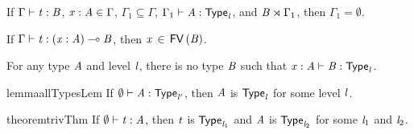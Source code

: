 \begin{lemma}
  \label{lemma:closed_ctxs}
  If $\Gamma  \vdash  \mathit{t}  :  \mathit{B}$, $ \mathit{x}  :  \mathit{A}  \in  \Gamma $, $\Gamma_{{\mathrm{1}}} \subseteq \Gamma$, $\Gamma_{{\mathrm{1}}}  \vdash  \mathit{A}  :   \mathsf{Type}_{ \mathit{l} } $, and $\mathit{B}  \rtimes  \Gamma_{{\mathrm{1}}}$,
  then $\Gamma_{{\mathrm{1}}} =  \emptyset $.
\end{lemma}

\begin{lemma}
  \label{lemma:arrow_bound_variables_must_be_used}
  If $\Gamma  \vdash  \mathit{t}  :  (  \mathit{x}  :  \mathit{A}  )  \multimap  \mathit{B}$, then $\mathit{x} \, \in \, \mathsf{FV} \, (  \mathit{B}  )$.
\end{lemma}

\begin{lemma}
  \label{lemma:no_type_dependency}
  For any type $\mathit{A}$ and level $\mathit{l}$, there is no type $\mathit{B}$ such that
  $\mathit{x}  :  \mathit{A}  \vdash  \mathit{B}  :   \mathsf{Type}_{ \mathit{l} } $.
\end{lemma}

\begin{restatable}{lemma}{allTypesLem}
  \label{lemma:all_types_are_type}
  If $ \emptyset   \vdash  \mathit{A}  :   \mathsf{Type}_{ \mathit{l'} } $, then $\mathit{A}$ is $ \mathsf{Type}_{ \mathit{l} } $ for some level $\mathit{l}$.
\end{restatable}

\begin{restatable}[Trivialization]{theorem}{trivThm}
  \label{theorem:trivalization}
  If $ \emptyset   \vdash  \mathit{t}  :  \mathit{A}$, then $\mathit{t}$ is $ \mathsf{Type}_{ \mathit{l_{{\mathrm{1}}}} } $ and $\mathit{A}$ is
  $ \mathsf{Type}_{ \mathit{l_{{\mathrm{2}}}} } $ for some $\mathit{l_{{\mathrm{1}}}}$ and $\mathit{l_{{\mathrm{2}}}}$.
\end{restatable}


